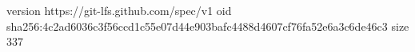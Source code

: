 version https://git-lfs.github.com/spec/v1
oid sha256:4c2ad6036c3f56ccd1c55e07d44e903bafc4488d4607cf76fa52e6a3c6de46c3
size 337
